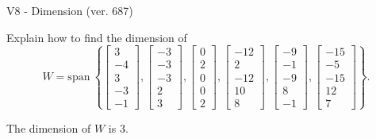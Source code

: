 \begin{exercise}
  \begin{exerciseTitle}V8 - Dimension (ver. 687)\end{exerciseTitle}
  \begin{exerciseStatement}
    Explain how to find the dimension of 
\[W=\mathrm{span}\ \left\{\left[\begin{array}{r}
3 \\
-4 \\
3 \\
-3 \\
-1
\end{array}\right] , \left[\begin{array}{r}
-3 \\
-3 \\
-3 \\
2 \\
3
\end{array}\right] , \left[\begin{array}{r}
0 \\
2 \\
0 \\
0 \\
2
\end{array}\right] , \left[\begin{array}{r}
-12 \\
2 \\
-12 \\
10 \\
8
\end{array}\right] , \left[\begin{array}{r}
-9 \\
-1 \\
-9 \\
8 \\
-1
\end{array}\right] , \left[\begin{array}{r}
-15 \\
-5 \\
-15 \\
12 \\
7
\end{array}\right]\right\}.\]



  \end{exerciseStatement}
  \begin{exerciseAnswer}
   The dimension of \(W\) is  \(3\).
  


  \end{exerciseAnswer}
\end{exercise}